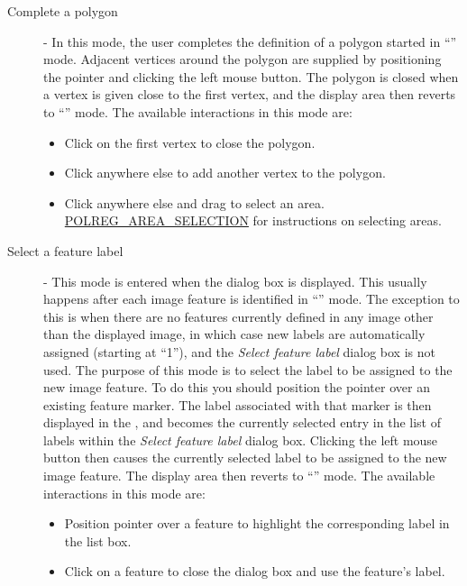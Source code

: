 \begin{description}
\begin{itemize}
\end{itemize}

\item [\mylabel{POLREG_MODE_2} Complete a polygon] - In this mode, the
user completes the definition of a polygon started in ``'' mode. Adjacent vertices around the
polygon are supplied by positioning the pointer and clicking the left
mouse button. The polygon is closed when a vertex is given close to the
first vertex, and the display area then reverts to ``'' mode. The available interactions in 
this mode are:

\begin{itemize}
\item Click on the first vertex to close the polygon.
\item Click anywhere else to add another vertex to the polygon.
\item Click anywhere else and drag to select an area. \hyperref{Go here}{See
section }{}{POLREG_AREA_SELECTION} for instructions on selecting areas.
\end{itemize}

\item [\mylabel{POLREG_MODE_3} Select a feature label] - This mode is
entered when the 
dialog box is displayed. This usually happens after each image feature is
identified in ``'' mode. The
exception to this is when there are no features currently defined in any
image other than the displayed image, in which case new labels are
automatically assigned (starting at ``1''), and the {\em Select feature
label} dialog box is not used. The purpose of this mode is to select the
label to be assigned to the new image feature. To do this you should
position the pointer over an existing feature marker. The label
associated with that marker is then displayed in the , and becomes the currently selected entry in
the list of labels within the {\em Select feature label} dialog box.
Clicking the left mouse button then causes the currently selected label
to be assigned to the new image feature. The display area then reverts to
``'' mode. 
The available interactions in this mode are:

\begin{itemize}
\item Position pointer over a feature to highlight the corresponding label 
in the list box.
\item Click on a feature to close the dialog box and use the feature's label.
\end{itemize}


\end{description}
